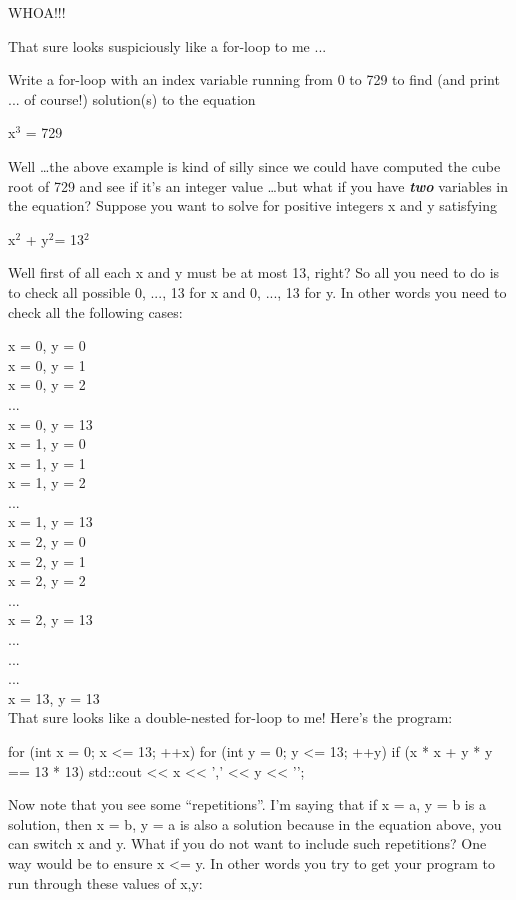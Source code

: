 \begin{console}
\begin{console}
WHOA!!!

That sure looks suspiciously like a for-loop to me ...

\begin{ex}
Write a for-loop with an index variable running from
0 to 729 to find (and print ... of course!) solution(s) to the equation

\begin{center}
x$^{3}$ = 729
\end{center}
\end{ex}
Well \ldots the above example is kind of silly since we could have
computed the cube root of 729 and see if it's an integer
value \ldots but what if you have \textit{\textbf{two}} variables in the
equation? Suppose you want to solve for positive integers x and y
satisfying

\begin{center}
x$^{2}$ + y$^{2}$= 13$^{2}$
\end{center}

Well first of all each x and y must be at most 13, right? So all you
need to do is to check all possible 0, ..., 13 for x and 0, ..., 13 for
y. In other words you need to check all the following cases:

x = 0, y = 0\\
x = 0, y = 1\\
x = 0, y = 2\\
...\\
x = 0, y = 13\\
x = 1, y = 0\\
x = 1, y = 1\\
x = 1, y = 2\\
...\\
x = 1, y = 13\\
x = 2, y = 0\\
x = 2, y = 1\\
x = 2, y = 2\\
...\\
x = 2, y = 13\\
...\\
...\\
...\\
x = 13, y = 13\\

That sure looks like a double-nested for-loop to me!
Here's the program:
\begin{console}
for (int x = 0; x <= 13; ++x)
{   
    for (int y = 0; y <= 13; ++y)
    {
        if (x * x + y * y == 13 * 13)
        {  
           std::cout << x << ',' << y << '\n';
        }
    }
}
\end{console}
Now note that you see some ``repetitions''. I'm saying
that if x = a, y = b is a solution, then x = b, y = a is also a solution
because in the equation above, you can switch x and y. What if you do
not want to include such repetitions? One way would be to ensure x
<= y. In other words you try to get your program to run through
these values of x,y:


\end{console}
\end{console}
